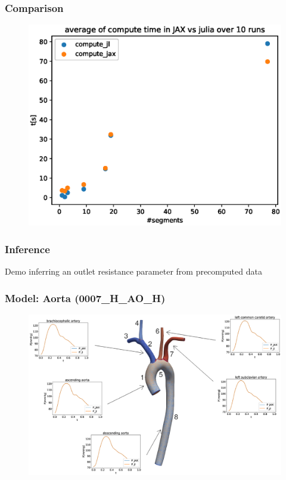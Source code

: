 \documentclass{beamer}
\begin{document}
	\begin{frame}
		\frametitle{Comparison}
		\begin{figure} [H]
			\centering
			\includegraphics[width=0.94\columnwidth]{images/comparison.eps}
			\label{fig:comparison}
		\end{figure}

	\end{frame}
	\begin{frame}
		\frametitle{Inference}
		\begin{block}{Demo}
			inferring an outlet resistance parameter from precomputed data
		\end{block}
	\end{frame}
	\begin{frame}
		\frametitle{Model: Aorta (0007\_H\_AO\_H)}
		\begin{figure} [H]
			\centering
			\includegraphics[width=\columnwidth]{images/0007.eps}
			\label{fig:aorta}
		\end{figure}
	\end{frame}
\end{document}
